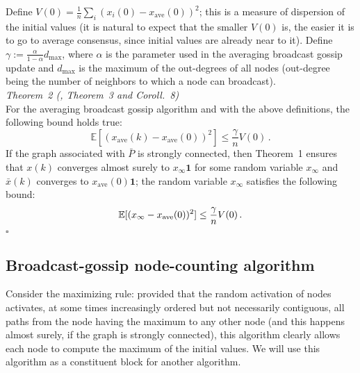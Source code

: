 \documentclass{article}
\begin{document}
\begin{itemize}
\begin{itemize}
	 Define $V(0) = \frac{1}{n} \sum_i (x_i(0) - x_{\text{ave}}(0))^2 $; this is a measure of dispersion of the initial values (it is natural to expect that the smaller $V(0)$ is, the easier it is to go to average consensus, since initial values are already near to it). Define $\gamma:= \frac{\alpha}{1-\alpha} d_{\max}$,
	 where $\alpha$ is the parameter used in the averaging broadcast gossip update and $d_{\max}$ is the maximum of the out-degrees of all nodes (out-degree being the number of neighbors to which a node can broadcast). \\
	\textit{Theorem~2 (\cite{gossip-small-error}, Theorem~3 and Coroll.~8)}\\
For the averaging broadcast gossip algorithm and with the above definitions, the following bound holds true:
\[ \mathbb E [ (x_{\text{ave}}(k) - x_{\text{ave}}(0))^2 ] \le
 \frac{\gamma}{n} V(0)  \, .\]
If the graph associated with $\bar P$ is strongly connected, then Theorem~1 ensures that
$x(k)$ converges almost surely to $x_{\infty} \mathbf 1$ for some random variable $x_{\infty}$ and $\bar x(k)$ converges to $x_{\text{ave}}(0) \mathbf 1$;  the random variable $x_{\infty}$ satisfies the following bound:
\[ \mathbb E [ (x_{\infty} - x_{\text{ave}}(0))^2 ] \le
\frac{\gamma}{n} V(0)\,. \vspace{-2mm}\]
\hfill $\square$


	\end{itemize}
\end{itemize}


\subsection{Broadcast-gossip node-counting algorithm}

Consider the maximizing rule: provided that the random activation of nodes activates, at some times increasingly ordered but not necessarily contiguous, all paths from the node having the maximum to any other node (and this happens almost surely, if the graph is strongly connected), this algorithm clearly allows each node to compute the maximum of the initial values. We will use this algorithm as a constituent block for another algorithm.\\
\end{document}
